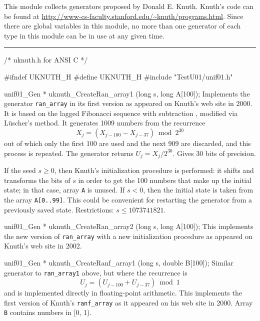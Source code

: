 
This module collects generators proposed by Donald E. Knuth.
Knuth's code can be found at
\url{http://www-cs-faculty.stanford.edu/~knuth/programs.html}.
Since there are global variables in this module, no more than
one generator of each type  in this module can be in use at any given
time. 


\bigskip
\hrule
\code
\hide
/* uknuth.h for ANSI C */

#ifndef UKNUTH_H
#define UKNUTH_H
\endhide
#include "TestU01/unif01.h"


unif01_Gen * uknuth_CreateRan_array1 (long s, long A[100]);
\endcode
  \tab  Implements the generator {\tt ran\_array} in its first version as
  appeared on Knuth's web site in 2000. It is
  based on the lagged Fibonacci sequence with
  subtraction \cite{rKNU98a}, modified via L\"uscher's method.
  It generates 1009 numbers from the recurrence
  $$
   X_j = (X_{j-100} - X_{j-37}) \bmod 2^{30}
  $$
  out of which only the first 100 are used and the
  next 909 are discarded, and this process is repeated.
  The generator returns $U_j = X_j/2^{30}$.
  Gives 30 bits of precision.

  If the seed $s \ge 0$, then Knuth's initialization procedure
  is performed: it shifts and transforms the bits of $s$  in order to get
  the 100 numbers that make up the initial state; in that case,
  array {\tt A} is unused.
  If  $s < 0$, then the initial state is taken from the array
  {\tt A[0..99]}.  This could be convenient for restarting the
  generator from a previously saved state.
  Restrictions: $s \le 1073741821$.
 \endtab
\code


unif01_Gen * uknuth_CreateRan_array2 (long s, long A[100]);
\endcode
  \tab
   This implements the new version of {\tt ran\_array} with a new
  initialization procedure as appeared on Knuth's web site in 2002.
 \endtab
\code


unif01_Gen * uknuth_CreateRanf_array1 (long s, double B[100]);
\endcode
  \tab Similar generator to {\tt ran\_array1} above, but
   where the recurrence is
   $$
    U_j = (U_{j-100} + U_{j-37}) \bmod 1
   $$
   and is  implemented directly in floating-point arithmetic.
   This implements the first version of Knuth's
    {\tt ranf\_array} as it
%
   appeared on his web site in 2000. Array {\tt B} contains
  numbers in [0, 1).
  \endtab
\code


